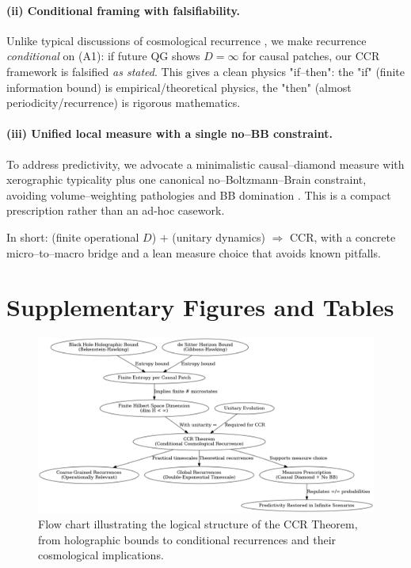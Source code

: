 \documentclass[12pt]{article}
\theoremstyle{remark}
\begin{document}
\paragraph{(ii) Conditional framing with falsifiability.}
Unlike typical discussions of cosmological recurrence \cite{DysonKlebanSusskind2002}, we make recurrence \emph{conditional} on (A1): if future QG shows $D=\infty$ for causal patches, our CCR framework is falsified \emph{as stated}. 
This gives a clean physics "if–then": the "if" (finite information bound) is empirical/theoretical physics, the "then" (almost periodicity/recurrence) is rigorous mathematics.

\paragraph{(iii) Unified local measure with a single no–BB constraint.}
To address predictivity, we advocate a minimalistic causal–diamond measure with xerographic typicality plus one canonical no–Boltzmann–Brain constraint, avoiding volume–weighting pathologies and BB domination \cite{DysonKlebanSusskind2002,Page2007}.
This is a compact prescription rather than an ad-hoc casework.

\noindent In short: (finite operational $D$) $+$ (unitary dynamics) $\Rightarrow$ CCR, with a concrete micro–to–macro bridge and a lean measure choice that avoids known pitfalls.




\nocite{*}

\appendix
\section{Supplementary Figures and Tables}

\begin{figure}[H]
    \centering
\includegraphics[width=0.9\linewidth]{CCR_flowchart}
    \caption{Flow chart illustrating the logical structure of the CCR Theorem, from holographic bounds to conditional recurrences and their cosmological implications.}
    \label{fig:CCR_flowchart}
\end{figure}
\end{document}
